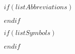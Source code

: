 \frontmatter

\buildFrontPages

$if(listAbbreviations)$



$endif$


$if(listSymbols)$



$endif$

\mainmatter

